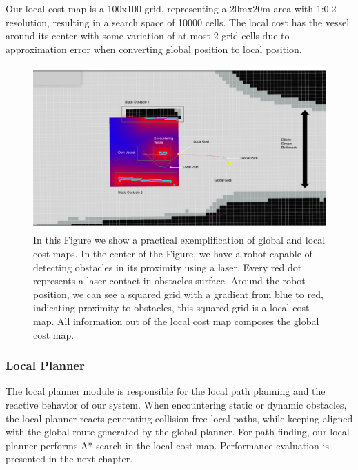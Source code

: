         Our local cost map is a 100x100 grid, representing a 20mx20m area with 1:0.2 resolution, resulting in a search space of 10000 cells. The local cost has the vessel around its center with some variation of at most 2 grid cells due to approximation error when converting global position to local position.
        
        \begin{figure}[H]
            \centering
            \includegraphics[scale=0.67]{figs/Chap4/costmaps.pdf}
            \caption{In this Figure we show a practical exemplification of global and local cost maps. In the center of the Figure, we have a robot capable of detecting obstacles in its proximity using a laser.  Every red dot represents a laser contact in obstacles surface. Around the robot position, we can see a squared grid with a gradient from blue to red, indicating proximity to obstacles, this squared grid is a local cost map. All information out of the local cost map composes the global cost map. }
            \label{fig:costmaps}
        \end{figure}

        \subsubsection{Local Planner}
        \label{sec:local_planner}
        
            The local planner module is responsible for the local path planning and the reactive behavior of our system. When encountering static or dynamic obstacles, 
            the local planner reacts generating collision-free local paths, while keeping aligned with the global route generated by the global planner. For path finding, our local planner performs A* search in the local cost map. Performance evaluation is presented in the next chapter.
            
